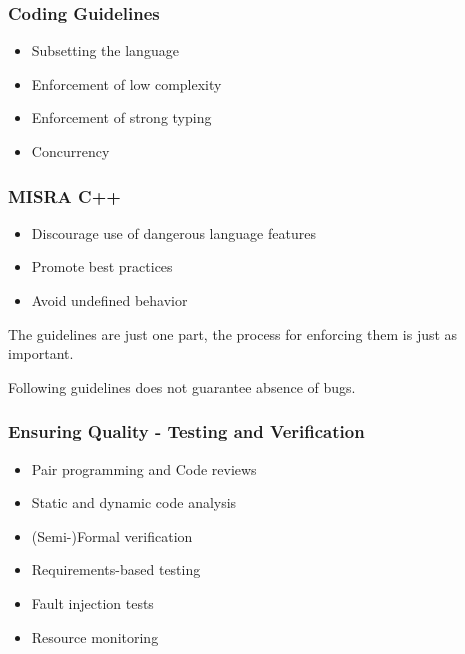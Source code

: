 \documentclass[aspectratio=169]{beamer}
\newif\iftransitions
\newcommand{\cpause}{\iftransitions \pause \fi}
\begin{document}
\begin{frame}
  \frametitle{Coding Guidelines}
  
   \cpause
  \begin{itemize}
    \item Subsetting the language \cpause
    \item Enforcement of low complexity \cpause
    \item Enforcement of strong typing \cpause
    \item Concurrency
  \end{itemize}
\end{frame}

\begin{frame}
  \frametitle{MISRA C++}
  
  \begin{itemize}
    \item Discourage use of dangerous language features
    \item Promote best practices
    \item Avoid undefined behavior
  \end{itemize}
  \cpause
  
  \vspace{10pt}
  The guidelines are just one part, the process for enforcing them is just as important.
  \cpause
  
  \vspace{15pt}
  Following guidelines does not guarantee absence of bugs.
  
\end{frame}

\begin{frame}
  \frametitle{Ensuring Quality - Testing and Verification}
  
   \cpause
  \begin{itemize}
    \item Pair programming and Code reviews \cpause
    \item Static and dynamic code analysis \cpause
    \item (Semi-)Formal verification \cpause
    \item Requirements-based testing \cpause
    \item Fault injection tests \cpause
    \item Resource monitoring
  \end{itemize}
  
\end{frame}
\end{document}
